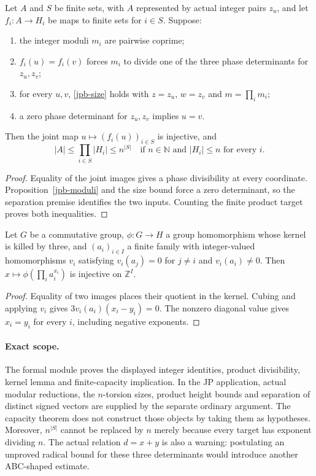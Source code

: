 \begin{proposition}\label{jpb-capacity}
Let $A$ and $S$ be finite sets, with $A$ represented by actual integer
pairs $z_u$, and let $f_i:A\to H_i$ be maps to finite sets for $i\in S$.
Suppose:
\begin{enumerate}
\item the integer moduli $m_i$ are pairwise coprime;
\item $f_i(u)=f_i(v)$ forces $m_i$ to divide one of the three phase
determinants for $z_u,z_v$;
\item for every $u,v$, \eqref{jpb-size} holds with $z=z_u$, $w=z_v$
and $m=\prod_i m_i$;
\item a zero phase determinant for $z_u,z_v$ implies $u=v$.
\end{enumerate}
Then the joint map $u\mapsto(f_i(u))_{i\in S}$ is injective, and
\[
 |A|\le\prod_{i\in S}|H_i|\le n^{|S|}
 \quad\text{if }n\in\mathbb N\text{ and }|H_i|\le n\text{ for every }i.
\]
\end{proposition}
\begin{proof}
Equality of the joint images gives a phase divisibility at every
coordinate. Proposition~\ref{jpb-moduli} and the size bound force a
zero determinant, so the separation premise identifies the two inputs.
Counting the finite product target proves both inequalities.
\end{proof}

\begin{lemma}
\label{jpb-kernel}
Let $G$ be a commutative group, $\phi:G\to H$ a group homomorphism
whose kernel is killed by three, and $(a_i)_{i\in I}$ a finite family
with integer-valued homomorphisms $v_i$ satisfying
$v_i(a_j)=0$ for $j\ne i$ and $v_i(a_i)\ne0$.
Then $x\mapsto\phi(\prod_i a_i^{x_i})$ is injective on $\mathbb Z^I$.
\end{lemma}
\begin{proof}
Equality of two images places their quotient in the kernel. Cubing
and applying $v_i$ gives $3v_i(a_i)(x_i-y_i)=0$. The nonzero diagonal
value gives $x_i=y_i$ for every $i$, including negative exponents.
\end{proof}

\paragraph{Exact scope.}
The formal module proves the displayed integer identities, product
divisibility, kernel lemma and finite-capacity implication. In the JP
application, actual modular reductions, the $n$-torsion sizes, product
height bounds and separation of distinct signed vectors are supplied
by the separate ordinary argument. The capacity theorem does not
construct those objects by taking them as hypotheses. Moreover,
$n^{|S|}$ cannot be replaced by $n$ merely because every target has
exponent dividing $n$. The actual relation $d=x+y$ is also a warning:
postulating an unproved radical bound for these three determinants
would introduce another ABC-shaped estimate.
